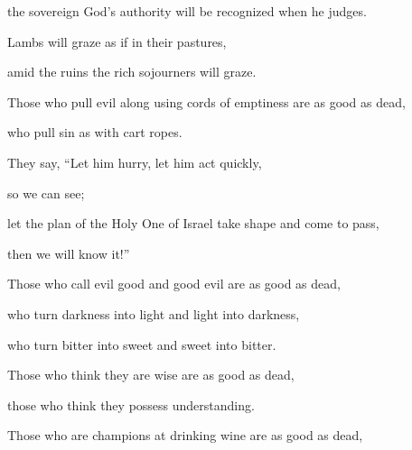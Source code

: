 {\par }{\Q the sovereign
God’s
authority will be recognized when he judges.
\par }{\Q {}Lambs
will graze
as if in their pastures,
\par }{\Q amid the ruins
the rich sojourners
will graze.
\par }{\Q {}Those
who pull
evil
along using cords
of emptiness
are as good as dead,

\par }{\Q who pull sin
as with cart
ropes.
\par }{\Q {}They say,
“Let him hurry,
let him act
quickly,
\par }{\Q so
we can see;
\par }{\Q let the plan
of the Holy One
of Israel
take shape
and come
to pass,
\par }{\Q then we will know it!”
\par }{\Q {}Those
who call evil
good
and good
evil
are as good as dead,

\par }{\Q who turn
darkness
into light
and light
into darkness,
\par }{\Q who turn
bitter
into sweet
and sweet
into bitter.
\par }{\Q {}Those
who think they are wise
are as good as dead,

\par }{\Q those who think
they possess
understanding.
\par }{\Q {}Those who are champions
at drinking
wine
are as good as dead,

}
